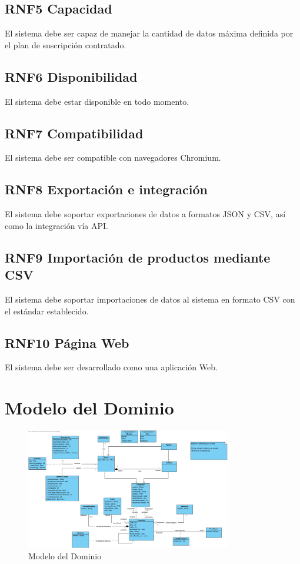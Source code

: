\documentclass[12pt.a4paper]{article}
\begin{document}
\subsection*{RNF5 Capacidad}
El sistema debe ser capaz de manejar la cantidad de datos máxima definida por el plan de suscripción contratado.

\subsection*{RNF6 Disponibilidad}
El sistema debe estar disponible en todo momento.

\subsection*{RNF7 Compatibilidad}
El sistema debe ser compatible con navegadores Chromium.

\subsection*{RNF8 Exportación e integración}
El sistema debe soportar exportaciones de datos a formatos JSON y CSV, así como la integración vía API.

\subsection*{RNF9 Importación de productos mediante CSV}
El sistema debe soportar importaciones de datos al sistema en formato CSV con el estándar establecido.


\subsection*{RNF10 Página Web}
El sistema debe ser desarrollado como una aplicación Web.

\section{Modelo del Dominio}

\begin{figure}[h]
    \centering
    \includegraphics[width=0.8\textwidth]{clases.jpg} %
    \caption{Modelo del Dominio}
    \label{fig:mi_imagen}
\end{figure}
\end{document}
